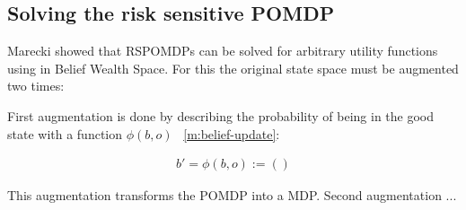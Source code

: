 \subsection{Solving the risk sensitive POMDP}

\normalsize
Marecki \cite{marecki} showed that RSPOMDPs can be solved for arbitrary utility functions using  in Belief Wealth Space.
For this the original state space must be augmented two times:

\begin{figure}[H]
\begin {center}
\end{center}
\end{figure}

First augmentation is done by describing the probability of being in the good state with a function $\phi(b,o)$ ~\autoref{m:belief-update}:

\begin{align}
    b' = \phi(b,o) := ()
\end{align}

This augmentation transforms the POMDP into a MDP.
Second augmentation ...